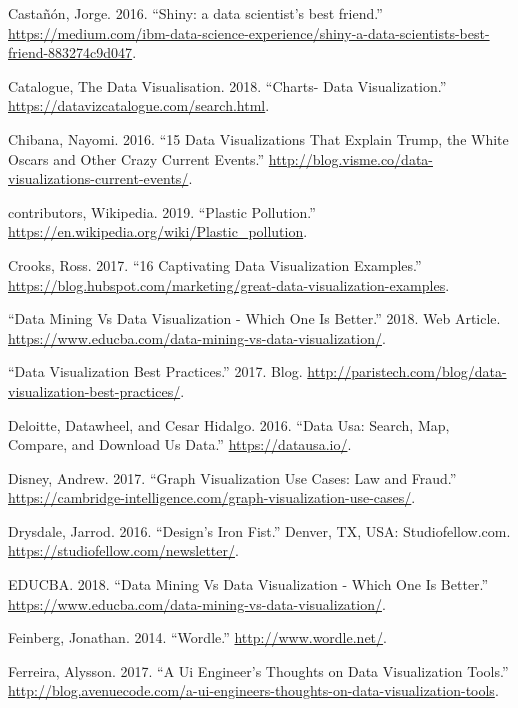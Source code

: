 \documentclass[]{book}
\begin{document}
\hypertarget{ref-shiny_interactive_viz}{}
Castañón, Jorge. 2016. ``Shiny: a data scientist's best friend.''
\url{https://medium.com/ibm-data-science-experience/shiny-a-data-scientists-best-friend-883274c9d047}.

\hypertarget{ref-charts_viz}{}
Catalogue, The Data Visualisation. 2018. ``Charts- Data Visualization.''
\url{https://datavizcatalogue.com/search.html}.

\hypertarget{ref-int_viz_current}{}
Chibana, Nayomi. 2016. ``15 Data Visualizations That Explain Trump, the
White Oscars and Other Crazy Current Events.''
\url{http://blog.visme.co/data-visualizations-current-events/}.

\hypertarget{ref-wiki_plastic_pollution}{}
contributors, Wikipedia. 2019. ``Plastic Pollution.''
\url{https://en.wikipedia.org/wiki/Plastic_pollution}.

\hypertarget{ref-int_viz_capt}{}
Crooks, Ross. 2017. ``16 Captivating Data Visualization Examples.''
\url{https://blog.hubspot.com/marketing/great-data-visualization-examples}.

\hypertarget{ref-datamining_vs_viz}{}
``Data Mining Vs Data Visualization - Which One Is Better.'' 2018. Web
Article.
\url{https://www.educba.com/data-mining-vs-data-visualization/}.

\hypertarget{ref-VizBP}{}
``Data Visualization Best Practices.'' 2017. Blog.
\url{http://paristech.com/blog/data-visualization-best-practices/}.

\hypertarget{ref-DataUSA}{}
Deloitte, Datawheel, and Cesar Hidalgo. 2016. ``Data Usa: Search, Map,
Compare, and Download Us Data.'' \url{https://datausa.io/}.

\hypertarget{ref-lawfraud}{}
Disney, Andrew. 2017. ``Graph Visualization Use Cases: Law and Fraud.''
\url{https://cambridge-intelligence.com/graph-visualization-use-cases/}.

\hypertarget{ref-Design_Iron_Fist}{}
Drysdale, Jarrod. 2016. ``Design's Iron Fist.'' Denver, TX, USA:
Studiofellow.com. \url{https://studiofellow.com/newsletter/}.

\hypertarget{ref-data_mining}{}
EDUCBA. 2018. ``Data Mining Vs Data Visualization - Which One Is
Better.''
\url{https://www.educba.com/data-mining-vs-data-visualization/}.

\hypertarget{ref-wordle}{}
Feinberg, Jonathan. 2014. ``Wordle.'' \url{http://www.wordle.net/}.

\hypertarget{ref-UI_engineer}{}
Ferreira, Alysson. 2017. ``A Ui Engineer's Thoughts on Data
Visualization Tools.''
\url{http://blog.avenuecode.com/a-ui-engineers-thoughts-on-data-visualization-tools}.
\end{document}
